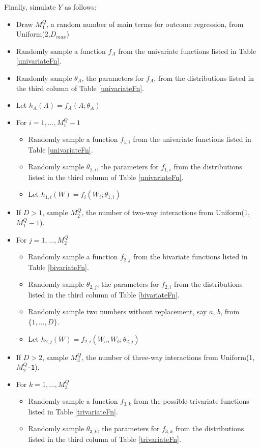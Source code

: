 \documentclass[12pt]{article}
\begin{document}
Finally, simulate $Y$ as follows: \begin{itemize}
\item Draw $M_1^Q$, a random number of main terms for outcome regression, from Uniform(2,$D_{max}$)
\item Randomly sample a function $f_{A}$ from the univariate functions listed in Table \ref{univariateFn}. 
\item Randomly sample $\theta_{A}$, the parameters for $f_{A}$, from the distributions listed in the third column of Table \ref{univariateFn}. 
\item Let $h_{A}(A) = f_A(A; \theta_A)$
\item For $i = 1, \dots, M_{1}^Q - 1$ \begin{itemize}
	\item Randomly sample a function $f_{1,i}$ from the univariate functions listed in Table \ref{univariateFn}. 
	\item Randomly sample $\theta_{1,i}$, the parameters for $f_{1,i}$ from the distributions listed in the third column of Table \ref{univariateFn}. 
	\item Let $h_{1,i}(W) = f_i(W_i; \theta_{1,i})$
\end{itemize}
\item If $D>1$, sample $M_{2}^Q$, the number of two-way interactions from Uniform(1,$M_{1}^Q - 1$). 
\item For $j = 1, \dots, M_{2}^Q$ \begin{itemize}
	\item Randomly sample a function $f_{2,j}$ from the bivariate functions listed in Table \ref{bivariateFn}. 
	\item Randomly sample $\theta_{2,j}$, the parameters for $f_{2,i}$ from the distributions listed in the third column of Table \ref{bivariateFn}. 
	\item Randomly sample two numbers without replacement, say $a$, $b$, from $\{1,\dots,D\}$.
	\item Let $h_{2,j}(W) = f_{2,i}(W_a, W_b; \theta_{2,j})$
\end{itemize}
\item If $D > 2$, sample $M_3^Q$, the number of three-way interactions from Uniform(1,\texttt{$M_2^Q$-1}). 
\item For $k = 1, \dots, M_{3}^Q$ \begin{itemize}
	\item Randomly sample a function $f_{3,k}$ from the possible trivariate functions listed in Table \ref{trivariateFn}. 
	\item Randomly sample $\theta_{3,k}$, the parameters for $f_{3,k}$ from the distributions listed in the third column of Table \ref{trivariateFn}. 

\end{itemize}
\end{itemize}
\end{document}
